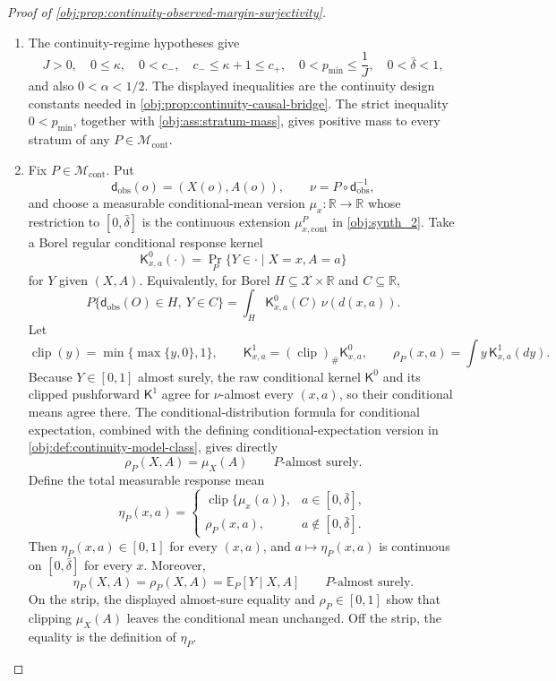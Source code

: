 \documentclass[11pt]{article}
\begin{document}
\begin{proof}[Proof of \cref{obj:prop:continuity-observed-margin-surjectivity}]
\begin{enumerate}
\item The continuity-regime hypotheses give
\[
J>0,\quad 0\le \kappa,\quad 0<c_-,\quad c_-\le \kappa+1\le c_+,\quad
0<p_{\min}\le \frac1J,\quad 0<\bar\delta<1,
\]
and also \(0<\alpha<1/2\).  The displayed inequalities are the continuity design constants needed in \cref{obj:prop:continuity-causal-bridge}.  The strict inequality \(0<p_{\min}\), together with \cref{obj:ass:stratum-mass}, gives positive mass to every stratum of any \(P\in\mathcal M_{\mathrm{cont}}\). %

\item Fix \(P\in\mathcal M_{\mathrm{cont}}\).  Put
\[
\mathsf d_{\mathrm{obs}}(o)=(X(o),A(o)),\qquad
\nu=P\circ\mathsf d_{\mathrm{obs}}^{-1},
\]
and choose a measurable conditional-mean version \(\mu_x:\mathbb R\to\mathbb R\) whose restriction to \([0,\bar\delta]\) is the continuous extension \(\mu_{x,\mathrm{cont}}^P\) in \cref{obj:synth_2}.  Take a Borel regular conditional response kernel
\[
\mathsf K^0_{x,a}(\cdot)=\Pr_P\{Y\in\cdot\mid X=x,A=a\}
\]
for \(Y\) given \((X,A)\).  Equivalently, for Borel \(H\subseteq\mathcal X\times\mathbb R\) and \(C\subseteq\mathbb R\),
\[
P\{\mathsf d_{\mathrm{obs}}(O)\in H,\ Y\in C\}
=
\int_H \mathsf K^0_{x,a}(C)\,\nu(d(x,a)).
\]
Let
\[
\operatorname{clip}(y)=\min\{\max\{y,0\},1\},\qquad
\mathsf K^1_{x,a}=(\operatorname{clip})_{\#}\mathsf K^0_{x,a},\qquad
\rho_P(x,a)=\int y\,\mathsf K^1_{x,a}(dy).
\]
Because \(Y\in[0,1]\) almost surely, the raw conditional kernel \(\mathsf K^0\) and its clipped pushforward \(\mathsf K^1\) agree for \(\nu\)-almost every \((x,a)\), so their conditional means agree there.  The conditional-distribution formula for conditional expectation, combined with the defining conditional-expectation version in \cref{obj:def:continuity-model-class}, gives directly
\[
\rho_P(X,A)=\mu_X(A)
\qquad P\text{-almost surely}.
\]
Define the total measurable response mean
\[
\eta_P(x,a)=
\begin{cases}
\operatorname{clip}\{\mu_x(a)\}, & a\in[0,\bar\delta],\\
\rho_P(x,a), & a\notin[0,\bar\delta].
\end{cases}
\]
Then \(\eta_P(x,a)\in[0,1]\) for every \((x,a)\), and \(a\mapsto\eta_P(x,a)\) is continuous on \([0,\bar\delta]\) for every \(x\).  Moreover,
\[
\eta_P(X,A)=\rho_P(X,A)=\mathbb E_P[Y\mid X,A]
\qquad P\text{-almost surely}.
\]
On the strip, the displayed almost-sure equality and \(\rho_P\in[0,1]\) show that clipping \(\mu_X(A)\) leaves the conditional mean unchanged.  Off the strip, the equality is the definition of \(\eta_P\). %


\end{enumerate}
\end{proof}
\end{document}
